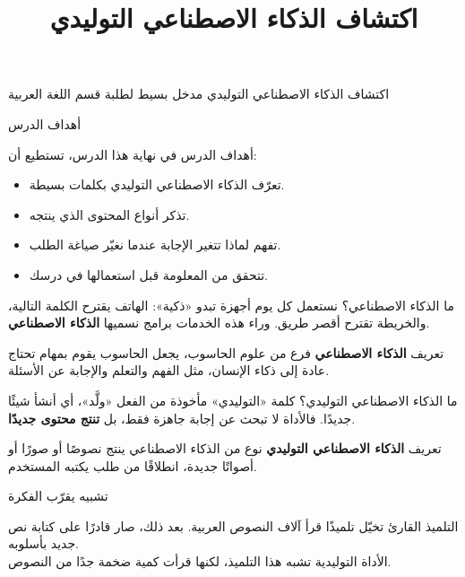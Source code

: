 \documentclass[aspectratio=169, 11pt, xcolor={table}]{beamer}
\title{اكتشاف الذكاء الاصطناعي التوليدي}
\begin{document}
{اكتشاف الذكاء الاصطناعي التوليدي}
{مدخل بسيط لطلبة قسم اللغة العربية}

\begin{frame}{أهداف الدرس}
    \begin{tbox}{\faBullseye\quad أهداف الدرس}
        في نهاية هذا الدرس، تستطيع أن:
        \begin{itemize}
            \item تعرّف الذكاء الاصطناعي التوليدي بكلمات بسيطة.
            \item تذكر أنواع المحتوى الذي ينتجه.
            \item تفهم لماذا تتغير الإجابة عندما نغيّر صياغة الطلب.
            \item تتحقق من المعلومة قبل استعمالها في درسك.
        \end{itemize}
    \end{tbox}
\end{frame}

\begin{frame}{ما الذكاء الاصطناعي؟}
    نستعمل كل يوم أجهزة تبدو «ذكية»: الهاتف يقترح الكلمة التالية،
    والخريطة تقترح أقصر طريق.
    وراء هذه الخدمات برامج نسميها \textbf{الذكاء الاصطناعي}.
    \begin{tbox}{\faLightbulb\quad تعريف}
        \textbf{الذكاء الاصطناعي} فرع من علوم الحاسوب،
        يجعل الحاسوب يقوم بمهام تحتاج عادة إلى ذكاء الإنسان،
        مثل الفهم والتعلم والإجابة عن الأسئلة.
    \end{tbox}
\end{frame}

\begin{frame}{ما الذكاء الاصطناعي التوليدي؟}
    كلمة «التوليدي» مأخوذة من الفعل «ولَّد»، أي أنشأ شيئًا جديدًا.
    فالأداة لا تبحث عن إجابة جاهزة فقط، بل \textbf{تنتج محتوى جديدًا}.
    \begin{tbox}{\faLightbulb\quad تعريف}
        \textbf{الذكاء الاصطناعي التوليدي} نوع من الذكاء الاصطناعي
        ينتج نصوصًا أو صورًا أو أصواتًا جديدة، انطلاقًا من طلب يكتبه المستخدم.
    \end{tbox}
    \begin{center}
    \end{center}
\end{frame}

\begin{frame}{تشبيه يقرّب الفكرة}
    \begin{tbox}{\faChalkboardTeacher\quad التلميذ القارئ}
        تخيّل تلميذًا قرأ آلاف النصوص العربية.
        بعد ذلك، صار قادرًا على كتابة نص جديد بأسلوبه.\\[3pt]
        الأداة التوليدية تشبه هذا التلميذ، لكنها قرأت كمية ضخمة جدًا من النصوص.
    \end{tbox}
\end{frame}
\end{document}

